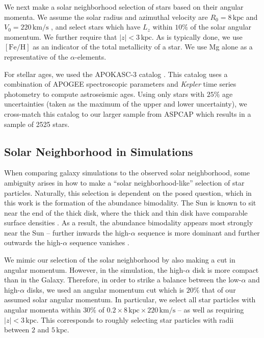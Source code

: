 \documentclass[twocolumn,linenumbers,trackchanges]{aastex631}
\newcommand{\kpc}{\ensuremath{\textrm{kpc}}}
\newcommand{\kms}{\ensuremath{\textrm{km}/\textrm{s}}}
\newcommand{\FeH}{\ensuremath{[\textrm{Fe}/\textrm{H}]}}
\begin{document}
We next make a solar neighborhood selection of stars based on their angular momenta. We assume the solar radius and azimuthal velocity are $R_0=8\,\kpc$ and $V_0=220\,\kms$ \citep{2016ARA&A..54..529B}, and select stars which have $L_z$ within $10\%$ of the solar angular momentum. We further require that $\left|z\right| < 3\,\kpc$. As is typically done, we use \FeH{} as an indicator of the total metallicity of a star. We use Mg alone as a representative of the $\alpha$-elements.

For stellar ages, we used the APOKASC-3 catalog \citep{2025ApJS..276...69P}. This catalog uses a combination of APOGEE spectroscopic parameters and \textit{Kepler} time series photometry to compute astroseismic ages. Using only stars with $25\%$ age uncertainties (taken as the maximum of the upper and lower uncertainty), we cross-match this catalog to our larger sample from ASPCAP which results in a sample of 2525 stars.

\subsection{Solar Neighborhood in Simulations}\label{ssec:solarneigh}
When comparing galaxy simulations to the observed solar neighborhood, some ambiguity arises in how to make a ``solar neighborhood-like'' selection of star particles. Naturally, this selection is dependent on the posed question, which in this work is the formation of the abundance bimodality. The Sun is known to sit near the end of the thick disk, where the thick and thin disk have comparable surface densities \citep[the ratio of thick-to-thin is $\sim12\%$][]{2016ARA&A..54..529B}. As a result, the abundance bimodality appears most strongly near the Sun -- further inwards the high-$\alpha$ sequence is more dominant and further outwards the high-$\alpha$ sequence vanishes \citep[e.g.,][]{2015ApJ...808..132H}.

We mimic our selection of the solar neighborhood by also making a cut in angular momentum. However, in the simulation, the high-$\alpha$ disk is more compact than in the Galaxy. Therefore, in order to strike a balance between the low-$\alpha$ and high-$\alpha$ disks, we used an angular momentum cut which is $20\%$ that of our assumed solar angular momentum. In particular, we select all star particles with angular momenta within $30\%$ of $0.2\times8\,\kpc\times220\,\kms$ -- as well as requiring $\left| z \right| < 3\,\kpc$. This corresponds to roughly selecting star particles with radii between $2$ and $5\,\kpc$.
\end{document}

